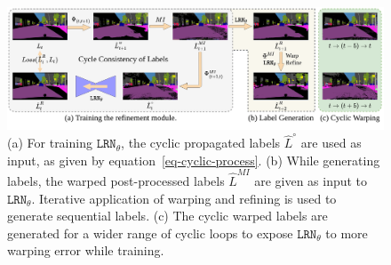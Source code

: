 \begin{figure}[t]
	\label{fig_method}
	\centering
	\includegraphics[width=1.0\linewidth]{figures/process_smaller_lr.png}
    \vspace{-2em}
	\caption{\small (a) For training $\texttt{LRN}_\theta$, the cyclic propagated labels $\hat{L}^{\circ}$ are used as input, as given by equation~\eqref{eq-cyclic-process}. (b) While generating labels, the warped post-processed labels $\hat{L}^{MI}$ are given as input to $\texttt{LRN}_\theta$. Iterative application of warping and refining is used to generate sequential labels. (c) The cyclic warped labels are generated for a wider range of cyclic loops to expose $\texttt{LRN}_\theta$ to more warping error while training.}
    \vspace{-1em}
\end{figure}
